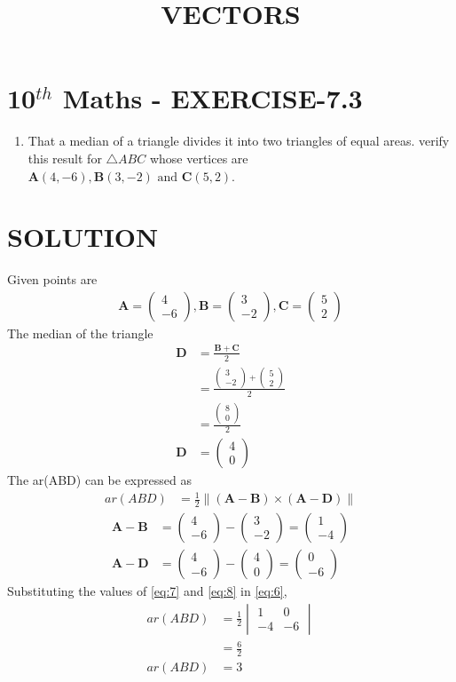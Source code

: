 \documentclass[12pt]{article}
\newcommand{\mydet}[1]{\ensuremath{\begin{vmatrix}#1\end{vmatrix}}}
\providecommand{\brak}[1]{\ensuremath{\left(#1\right)}}
\newcommand{\myvec}[1]{\ensuremath{\begin{pmatrix}#1\end{pmatrix}}}
\providecommand{\norm}[1]{\left\lVert#1\right\rVert}
\let\vec\mathbf
\begin{document}
\begin{center}
\title{\textbf{VECTORS}}
\date{\vspace{-5ex}} %
\maketitle
\end{center}

\section{10$^{th}$ Maths - EXERCISE-7.3}

\begin{enumerate}
\item That a median of a triangle divides it into two triangles  of equal areas. verify this result for $\triangle ABC$ whose vertices are $\vec{A}(4,-6),\vec{B}(3,-2)\text{ and }\vec{C}(5,2)$.
\end{enumerate}

\section{SOLUTION}
Given points are
\begin{align}
\vec{A}=\myvec{4\\ -6} ,
\vec{B}=\myvec{3\\ -2} ,
\vec{C}=\myvec{5\\ 2}
\end{align}
The median of the triangle 
\begin{align}
\vec{D}&=\frac{\vec{B}+\vec{C}}{2}\\
&=\frac{\myvec{3\\ -2}+\myvec{5\\ 2}}{2}\\
&=\frac{\myvec{8\\ 0}}{2}\\
\vec{D}&=\myvec{4\\ 0}
\end{align}
The ar(ABD) can be expressed as
 \begin{align}
  ar(ABD)&=\frac{1}{2} \norm{\brak{\vec{A}-\vec{B}}  \times 
   \brak{\vec{A}- \vec{D}}} \label{eq:6} 
\end{align}
\begin{align}
	\vec{A}- \vec{B} &= \myvec{4\\ -6}-\myvec{3\\ -2}=\myvec{1\\ -4}\label{eq:7}\\
	  \vec{A}- \vec{D} &= \myvec{4\\ -6}-\myvec{4\\ 0}=\myvec{0\\ -6}\label{eq:8}
  \end{align}
Substituting the values of \eqref{eq:7} and \eqref{eq:8} in \eqref{eq:6},
\begin{align}
	ar(ABD)&=\frac{1}{2}\mydet{1 & 0\\-4 & -6}\\  
	       &=	\frac{6}{2}\\
	ar(ABD)&=3
\end{align}
\end{document}
